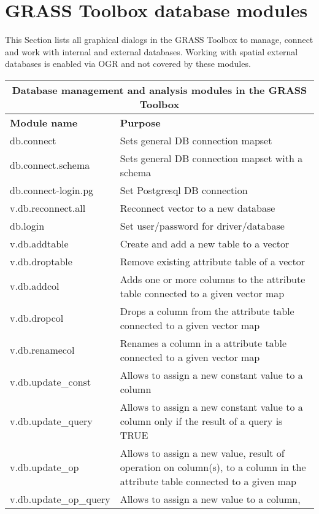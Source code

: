 \section{GRASS Toolbox database modules}

This Section lists all graphical dialogs in the GRASS Toolbox to manage, 
connect and work with internal and external databases. Working with spatial 
external databases is enabled via OGR and not covered by these modules.

\begin{table}[H]
\centering
 \begin{tabular}{|p{4cm}|p{10cm}|}
  \hline \multicolumn{2}{|c|}{\textbf{Database management and analysis modules in the GRASS
  Toolbox}} \\
  \hline \textbf{Module name} & \textbf{Purpose} \\
  \hline db.connect & Sets general DB connection mapset \\
  \hline db.connect.schema & Sets general DB connection mapset with a schema \\
  \hline db.connect-login.pg & Set Postgresql DB connection \\
  \hline v.db.reconnect.all & Reconnect vector to a new database \\
  \hline db.login & Set user/password for driver/database \\
  \hline v.db.addtable & Create and add a new table to a vector \\
  \hline v.db.droptable & Remove existing attribute table of a vector \\
  \hline v.db.addcol & Adds one or more columns to the attribute table
  connected to a given vector map \\
  \hline v.db.dropcol & Drops a column from the attribute table connected to
  a given vector map\\
  \hline v.db.renamecol & Renames a column in a attribute table connected to
  a given vector map\\
  \hline v.db.update\_const & Allows to assign a new constant value to a
  column \\
  \hline v.db.update\_query & Allows to assign a new constant value to a
  column only if the result of a query is TRUE \\
  \hline v.db.update\_op & Allows to assign a new value, result of operation
  on column(s), to a column in the attribute table connected to a given map\\
  \hline v.db.update\_op\_query & Allows to assign a new value to a column,

\end{tabular}
\end{table}
